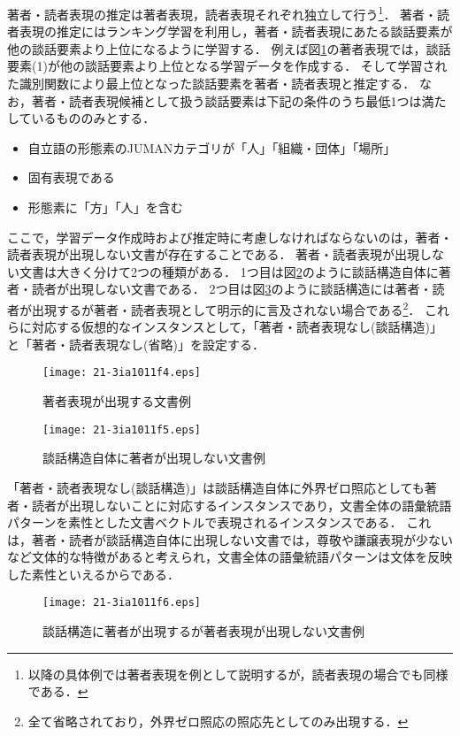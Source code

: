 \documentclass[japanese]{jnlp_1.4}
\begin{document}
著者・読者表現の推定は著者表現，読者表現それぞれ独立して行う\footnote{以降の具体例では著者表現を例として説明するが，読者表現の場合でも同様である．}．
著者・読者表現の推定にはランキング学習を利用し，著者・読者表現にあたる談話要素が他の談話要素より上位になるように学習する．
例えば図\ref{著者表現が出現する文章例}の著者表現では，談話要素(1)が他の談話要素より上位となる学習データを作成する．
そして学習された識別関数により最上位となった談話要素を著者・読者表現と推定する．
なお，著者・読者表現候補として扱う談話要素は下記の条件のうち最低1つは満たしているもののみとする．
\begin{itemize}
 \item 自立語の形態素のJUMANカテゴリが「人」「組織・団体」「場所」
 \item 固有表現である
 \item 形態素に「方」「人」を含む
\end{itemize}

ここで，学習データ作成時および推定時に考慮しなければならないのは，著者・読者表現が出現しない文書が存在することである．
著者・読者表現が出現しない文書は大きく分けて2つの種類がある．
1つ目は図\ref{談話構造自体に著者が出現しない文章例}のように談話構造自体に著者・読者が出現しない文書である．
2つ目は図\ref{談話構造に著者が出現するが著者表現が出現しない文章例}のように談話構造には著者・読者が出現するが著者・読者表現として明示的に言及されない場合である\footnote{全て省略されており，外界ゼロ照応の照応先としてのみ出現する．}．
これらに対応する仮想的なインスタンスとして，「著者・読者表現なし(談話構造)」と「著者・読者表現なし(省略)」を設定する．

\begin{figure}[b]
\texttt{[image: 21-3ia1011f4.eps]}
\caption{著者表現が出現する文書例}
\label{著者表現が出現する文章例}
\end{figure}
\begin{figure}[b]
\texttt{[image: 21-3ia1011f5.eps]}
\caption{談話構造自体に著者が出現しない文書例}
\label{談話構造自体に著者が出現しない文章例}
\end{figure}

「著者・読者表現なし(談話構造)」は談話構造自体に外界ゼロ照応としても著者・読者が出現しないことに対応するインスタンスであり，文書全体の語彙統語パターンを素性とした文書ベクトルで表現されるインスタンスである．
これは，著者・読者が談話構造自体に出現しない文書では，尊敬や謙譲表現が少ないなど文体的な特徴があると考えられ，文書全体の語彙統語パターンは文体を反映した素性といえるからである．

\begin{figure}[t]
\texttt{[image: 21-3ia1011f6.eps]}
\caption{談話構造に著者が出現するが著者表現が出現しない文書例}
\label{談話構造に著者が出現するが著者表現が出現しない文章例}
\end{figure}
\end{document}
